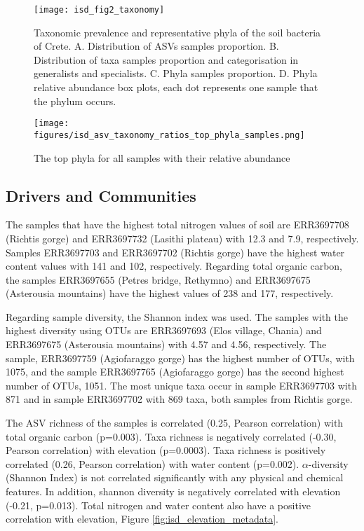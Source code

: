 \begin{figure}[hbt!] 
    \centering\texttt{[image: isd\_fig2\_taxonomy]}
    \caption{Taxonomic prevalence and representative phyla of the soil bacteria of Crete. 
    A. Distribution of ASVs samples proportion. B. Distribution of taxa samples
proportion and categorisation in generalists and specialists. C. Phyla samples proportion.
D. Phyla relative abundance box plots, each dot represents one sample that the phylum occurs.}
    \label{fig:isd_fig2_taxonomy}
\end{figure}


\begin{figure}[hbt!]
      \centering
      \texttt{[image: figures/isd\_asv\_taxonomy\_ratios\_top\_phyla\_samples.png]}
      \caption[Top phyla of each samples]{The top phyla for all samples with their relative abundance}
      \label{fig:isd_top_phyla_samples}
\end{figure}
   

\subsection{Drivers and Communities}\label{isd_communities}

The samples that have the highest total nitrogen values of soil are
ERR3697708 (Richtis gorge) and ERR3697732 (Lasithi plateau) with 12.3 and 7.9, respectively.
Samples ERR3697703 and ERR3697702 (Richtis gorge) have the highest water content values with 141 and 102, respectively.
Regarding total organic carbon, the samples ERR3697655 (Petres bridge, Rethymno)
and ERR3697675 (Asterousia mountains) have the highest values of 238 and 177, respectively.

Regarding sample diversity, the Shannon index was used.
The samples with the highest diversity using OTUs are ERR3697693 (Elos village, Chania) and
ERR3697675 (Asterousia mountains) with 4.57 and 4.56, respectively.
The sample, ERR3697759 (Agiofaraggo gorge) has the highest number of OTUs, with 1075,
and the sample ERR3697765 (Agiofaraggo gorge) has the second highest number of OTUs, 1051.
The most unique taxa occur in sample ERR3697703 with 871 and in sample ERR3697702
with 869 taxa, both samples from Richtis gorge.

The ASV richness of the samples is correlated (0.25, Pearson correlation) with total organic carbon (p=0.003).
Taxa richness is negatively correlated (-0.30, Pearson correlation) with elevation (p=0.0003). 
Taxa richness is positively correlated (0.26, Pearson correlation) with water content (p=0.002).
$\alpha$-diversity (Shannon Index) is not correlated significantly with any physical and chemical features.
In addition, shannon diversity is negatively correlated with elevation (-0.21, p=0.013).
Total nitrogen and water content also have a positive correlation with elevation, Figure \ref{fig:isd_elevation_metadata}. 

